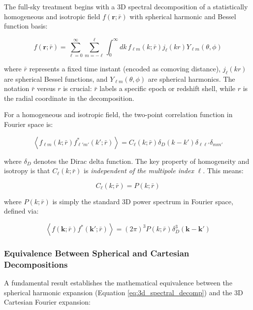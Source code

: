The full-sky treatment begins with a 3D spectral decomposition of a statistically homogeneous and isotropic field $f(\mathbf{r}; \bar{r})$ with spherical harmonic and Bessel function basis:

\begin{equation}
f(\mathbf{r}; \bar{r}) = \sum_{\ell=0}^\infty \sum_{m=-\ell}^\ell \int_0^\infty dk \, f_{\ell m}(k; \bar{r}) j_\ell(kr) Y_{\ell m}(\theta, \phi)
\label{eq:3d_spectral_decomp}
\end{equation}

where $\bar{r}$ represents a fixed time instant (encoded as comoving distance), $j_\ell(kr)$ are spherical Bessel functions, and $Y_{\ell m}(\theta, \phi)$ are spherical harmonics. The notation $\bar{r}$ versus $r$ is crucial: $\bar{r}$ labels a specific epoch or redshift shell, while $r$ is the radial coordinate in the decomposition.

For a homogeneous and isotropic field, the two-point correlation function in Fourier space is:

\begin{equation}
\left\langle f_{\ell m}(k; \bar{r}) f_{\ell' m'}^*(k'; \bar{r}) \right\rangle = C_\ell(k; \bar{r}) \delta_D(k - k') \delta_{\ell\ell'} \delta_{m m'}
\label{eq:full_sky_corr_def}
\end{equation}

where $\delta_D$ denotes the Dirac delta function. The key property of homogeneity and isotropy is that $C_\ell(k; \bar{r})$ is \emph{independent of the multipole index} $\ell$. This means:

\begin{equation}
C_\ell(k; \bar{r}) = P(k; \bar{r})
\label{eq:isotropy_independence}
\end{equation}

where $P(k; \bar{r})$ is simply the standard 3D power spectrum in Fourier space, defined via:

\begin{equation}
\left\langle f(\mathbf{k}; \bar{r}) f^*(\mathbf{k}'; \bar{r}) \right\rangle = (2\pi)^3 P(k; \bar{r}) \delta_D^3(\mathbf{k} - \mathbf{k}')
\label{eq:3d_fourier_power}
\end{equation}

\subsubsection{Equivalence Between Spherical and Cartesian Decompositions}

A fundamental result establishes the mathematical equivalence between the spherical harmonic expansion (Equation \ref{eq:3d_spectral_decomp}) and the 3D Cartesian Fourier expansion:

